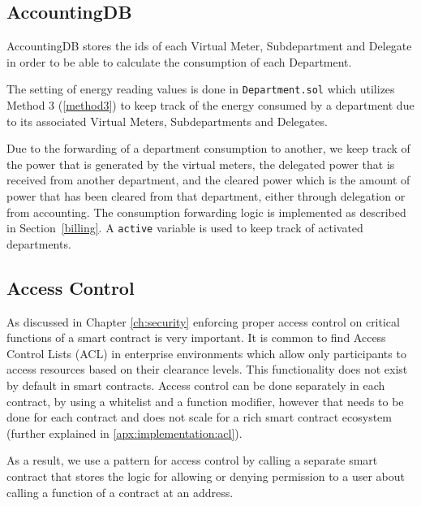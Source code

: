 

\subsection{AccountingDB}

AccountingDB stores the ids of each Virtual Meter, Subdepartment and Delegate in order to be able to calculate the consumption of each Department. 

The setting of energy reading values is done in \texttt{Department.sol} which utilizes Method 3 (\ref{method3}) to keep track of the energy consumed by a department due to its associated Virtual Meters, Subdepartments and Delegates. 

Due to the forwarding of a department consumption to another, we keep track of the power that is generated by the virtual meters, the delegated power that is received from another department, and the cleared power which is the amount of power that has been cleared from that department, either through delegation or from accounting. The consumption forwarding logic is implemented as described in Section~\ref{billing}. A \texttt{active} variable is used to keep track of activated departments.



\subsection{Access Control}
As discussed in Chapter \ref{ch:security} enforcing proper access control on critical functions of a smart contract is very important. It is common to find Access Control Lists (ACL) in enterprise environments which allow only participants to access resources based on their clearance levels. This functionality does not exist by default in smart contracts. Access control can be done separately in each contract, by using a whitelist and a function modifier, however that needs to be done for each contract and does not scale for a rich smart contract ecosystem (further explained in \ref{apx:implementation:acl}). 

As a result, we use a pattern for access control by calling a separate smart contract that stores the logic for allowing or denying permission to a user about calling a function of a contract at an address. 

